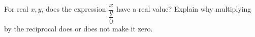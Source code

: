 For real $x,y$, does the expression $\dfrac{x}{\dfrac{y}{0}}$ have a real value? Explain why multiplying by the reciprocal does or does not make it zero.
